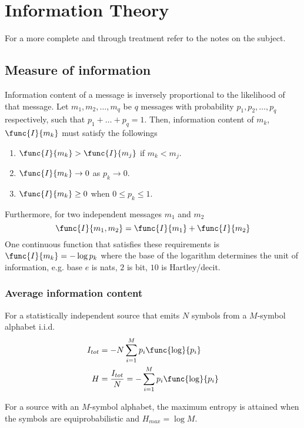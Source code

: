 \chapter{Information Theory}
\begin{remark}
    For a more complete and through treatment refer to the notes on the subject.
\end{remark}
\section{Measure of information}
Information content of a message is inversely proportional to the likelihood of that message. Let \(m_1,m_2, \dots,m_q\) be \(q\) messages with probability \(p_1,p_2, \dots , p_q\) respectively, such that \(p_1 + \dots + p_q = 1\). Then, information content of \(m_k\), \(\func{I}{m_k}\) must satisfy the followings 
\begin{enumerate}
    \item \(\func{I}{m_k} > \func{I}{m_j}\) if \(m_k < m_j\).
    \item \(\func{I}{m_k} \to 0\) as \(p_k \to 0\).
    \item \(\func{I}{m_k} \geq 0\) when \(0 \leq p_k \leq 1\).
\end{enumerate}
Furthermore, for two independent messages \(m_1\) and \(m_2\) 
\begin{equation*}
    \func{I}{m_1, m_2} = \func{I}{m_1} + \func{I}{m_2}
\end{equation*}
One continuous function that satisfies these requirements is \(\func{I}{m_k} = - \log p_k\) where the base of the logarithm determines the unit of information, e.g. base \(e\) is nats, \(2\) is bit, \(10\) is Hartley/decit.

\subsection{Average information content}
For a statistically independent source that emits \(N\) symbols from a \(M\)-symbol alphabet i.i.d. 
\begin{align*}
    I_{tot} &= -N \sum_{i = 1}^M p_i \func{\log}{p_i}\\
    H &= \dfrac{I_{tot}}{N} = -\sum_{i = 1}^M p_i \func{\log}{p_i}
\end{align*}

\begin{proposition}
    For a source with an \(M\)-symbol alphabet, the maximum entropy is attained when the symbols are equiprobabilistic and \(H_{max} = \log M\).
\end{proposition}

